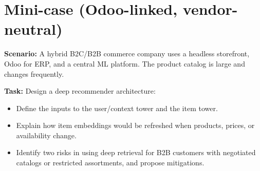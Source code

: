 \section{Mini-case (Odoo-linked, vendor-neutral)}
\textbf{Scenario:} A hybrid B2C/B2B commerce company uses a headless storefront, Odoo for ERP, and a central ML platform. The product catalog is large and changes frequently.

\textbf{Task:} Design a deep recommender architecture:
\begin{itemize}
  \item Define the inputs to the user/context tower and the item tower.
  \item Explain how item embeddings would be refreshed when products, prices, or availability change.
  \item Identify two risks in using deep retrieval for B2B customers with negotiated catalogs or restricted assortments, and propose mitigations.
\end{itemize}
